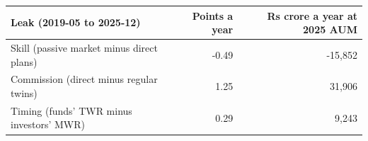\begin{tabular}{lrr}
\toprule
Leak (2019-05 to 2025-12) & Points a year & Rs crore a year at 2025 AUM \\
\midrule
Skill (passive market minus direct plans) & -0.49 & -15,852 \\
Commission (direct minus regular twins) & 1.25 & 31,906 \\
Timing (funds' TWR minus investors' MWR) & 0.29 & 9,243 \\
\bottomrule
\end{tabular}
